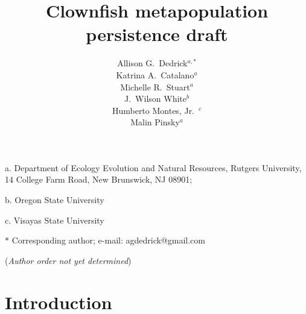 \documentclass[12pt, oneside]{article}   	%
\author{}
\author{Allison G.\ Dedrick$^{a, \ast}$ \\
Katrina A.\ Catalano$^a$ \\
Michelle R.\ Stuart$^a$ \\
J.\ Wilson White$^b$ \\
Humberto Montes, Jr.\ $^c$ \\
Malin Pinsky$^a$}
\title{Clownfish metapopulation persistence draft}
\date{}
\begin{document}
\renewcommand{\topfraction}{0.95}
\maketitle{}

\noindent{} a. Department of Ecology Evolution and Natural Resources, Rutgers University, 14 College Farm Road, New Brunswick, NJ 08901;

\noindent{} b. Oregon State University

\noindent{} c. Visayas State University

\noindent{} $\ast$ Corresponding author; e-mail: agdedrick@gmail.com

(\textit{Author order not yet determined})


\bigskip







\section*{Introduction}
\end{document}
